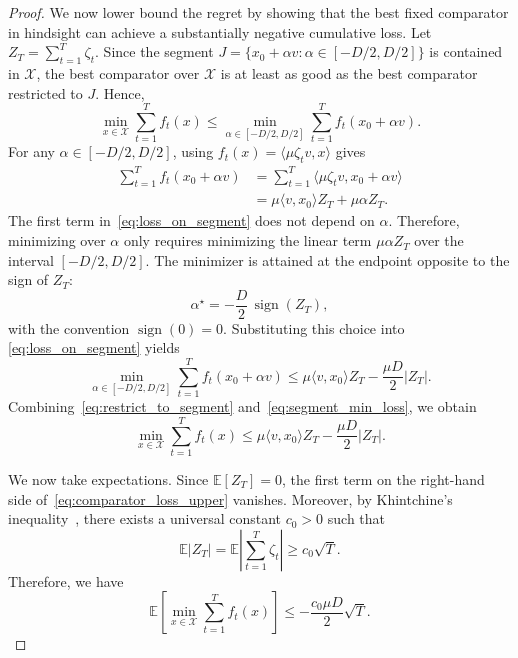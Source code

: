 \documentclass[journal,onecolumn]{IEEEtran}
\newcommand{\cX}{\mathcal{X}}
\theoremstyle{plain}
\theoremstyle{definition}
\theoremstyle{remark}
\begin{document}
{\begin{proof}
We now lower bound the regret by showing that the best fixed comparator in
hindsight can achieve a substantially negative cumulative loss. Let $Z_T=\sum_{t=1}^T \zeta_t$. Since the segment $J=\{x_0+\alpha v:\alpha\in[-D/2,D/2]\}$ is contained in $\cX$, the best comparator over $\cX$ is at least as good as the
best comparator restricted to $J$. Hence,
\begin{equation}
    \min_{x\in\cX}\sum_{t=1}^T f_t(x)
    \le
    \min_{\alpha\in[-D/2,D/2]}
    \sum_{t=1}^T f_t(x_0+\alpha v).
    \label{eq:restrict_to_segment}
\end{equation}
For any $\alpha\in[-D/2,D/2]$, using $f_t(x)=\langle \mu\zeta_t v,x\rangle$ gives
\begin{equation}
\begin{aligned}
    \sum_{t=1}^T f_t(x_0+\alpha v)
    &=
    \sum_{t=1}^T
    \langle \mu\zeta_t v,x_0+\alpha v\rangle  \\
    &=
    \mu\langle v,x_0\rangle Z_T
    +
    \mu\alpha Z_T .
\end{aligned}
\label{eq:loss_on_segment}
\end{equation}
The first term in~\eqref{eq:loss_on_segment} does not depend on $\alpha$.
Therefore, minimizing over $\alpha$ only requires minimizing the linear term
$\mu\alpha Z_T$ over the interval $[-D/2,D/2]$. The minimizer is attained at the
endpoint opposite to the sign of $Z_T$:
\begin{equation*}
    \alpha^\star
    =
    -\frac D2\,\operatorname{sign}(Z_T),
\end{equation*}
with the convention $\operatorname{sign}(0)=0$. Substituting this choice into
\eqref{eq:loss_on_segment} yields
\begin{equation}
    \min_{\alpha\in[-D/2,D/2]}
    \sum_{t=1}^T f_t(x_0+\alpha v)
    \le
    \mu\langle v,x_0\rangle Z_T
    -
    \frac{\mu D}{2}|Z_T|.
    \label{eq:segment_min_loss}
\end{equation}
Combining~\eqref{eq:restrict_to_segment} and~\eqref{eq:segment_min_loss}, we obtain
\begin{equation}
    \min_{x\in\cX}\sum_{t=1}^T f_t(x)
    \le
    \mu\langle v,x_0\rangle Z_T
    -
    \frac{\mu D}{2}|Z_T|.
    \label{eq:comparator_loss_upper}
\end{equation}

We now take expectations. Since $\mathbb E[Z_T]=0$, the first term on the
right-hand side of~\eqref{eq:comparator_loss_upper} vanishes. Moreover, by
Khintchine's inequality~\cite[Lemma~A.9]{cesa2006prediction}, there exists a universal constant $c_0>0$ such that
\begin{equation*}
    \mathbb E|Z_T|
    =
    \mathbb E\left|\sum_{t=1}^T\zeta_t\right|
    \ge
    c_0\sqrt T .
\end{equation*}
Therefore, we have
\begin{equation}
    \mathbb E\left[
        \min_{x\in\cX}
        \sum_{t=1}^T f_t(x)
    \right]
    \le
    -
    \frac{c_0\mu D}{2}\sqrt T .
    \label{eq:expected_comparator_loss}
\end{equation}


\end{proof}}
\end{document}
